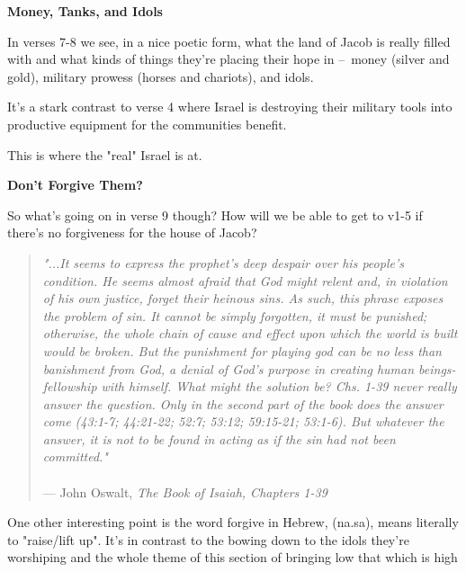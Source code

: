 \documentclass[11pt]{article}
\begin{document}
\vspace{3em}
{\large\bfseries Money, Tanks, and Idols}
\vspace{1em}

In verses 7-8 we see, in a nice poetic form, what the land of Jacob is really filled with
and what kinds of things they're placing their hope in – money (silver and gold), military prowess (horses and chariots), and idols.

{\vspace{1em}}

It's a stark contrast to verse 4 where Israel is destroying their military tools into productive equipment for the communities benefit.

This is where the "real" Israel is at.


\vspace{3em}
{\large\bfseries Don't Forgive Them?}
\vspace{1em}

So what's going on in verse 9 though? How will we be able to get to v1-5 if there's no forgiveness for the house of Jacob?

{\vspace{1em}}

\begin{quote}
\textit{"...It seems to express the prophet's deep despair over his people's condition. He seems almost afraid that God might relent and, in violation of his own justice, forget their heinous sins. As such, this phrase exposes the problem of sin. It cannot be simply forgotten, it must be punished; otherwise, the whole chain of cause and effect upon which the world is built would be broken. But the punishment for playing god can be no less than banishment from God, a denial of God's purpose in creating human beings-fellowship with himself. What might the solution be? Chs. 1-39 never really answer the question. Only in the second part of the book does the answer come (43:1-7; 44:21-22; 52:7; 53:12;
59:15-21; 53:1-6). But whatever the answer, it is not to be found in acting as if the sin had not been committed."}\\\\
\hfill --- John Oswalt, \textit{The Book of Isaiah, Chapters 1-39}
\end{quote}


One other interesting point is the word forgive in Hebrew,  (na.sa), means literally to "raise/lift up". It's in contrast to the bowing down to the idols they're worshiping and the whole theme of this section of bringing low that which is high
\end{document}
